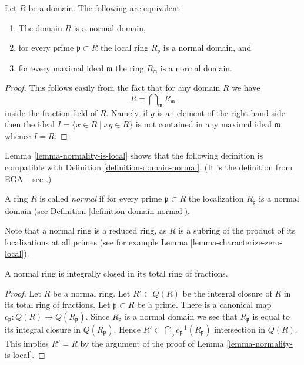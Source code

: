\begin{lemma}
\label{lemma-normality-is-local}
Let $R$ be a domain. The following are equivalent:
\begin{enumerate}
\item The domain $R$ is a normal domain,
\item for every prime $\mathfrak p \subset R$ the local ring
$R_{\mathfrak p}$ is a normal domain, and
\item for every maximal ideal $\mathfrak m$ the ring $R_{\mathfrak m}$
is a normal domain.
\end{enumerate}
\end{lemma}

\begin{proof}
This follows easily from the fact that for any domain $R$ we have
$$
R = \bigcap\nolimits_{\mathfrak m} R_{\mathfrak m}
$$
inside the fraction field of $R$. Namely, if $g$ is an element of
the right hand side then the ideal $I = \{x \in R \mid xg \in R\}$
is not contained in any maximal ideal $\mathfrak m$, whence $I = R$.
\end{proof}

\noindent
Lemma \ref{lemma-normality-is-local} shows that the following definition
is compatible with Definition \ref{definition-domain-normal}. (It is the
definition from EGA -- see \cite[IV, 5.13.5 and 0, 4.1.4]{EGA}.)

\begin{definition}
\label{definition-ring-normal}
A ring $R$ is called {\it normal} if for every prime
$\mathfrak p \subset R$ the localization $R_{\mathfrak p}$ is
a normal domain (see Definition \ref{definition-domain-normal}).
\end{definition}

\noindent
Note that a normal ring is a reduced ring, as $R$ is a subring of the product
of its localizations at all primes (see for example
Lemma \ref{lemma-characterize-zero-local}).

\begin{lemma}
\label{lemma-normal-ring-integrally-closed}
A normal ring is integrally closed in its total ring of fractions.
\end{lemma}

\begin{proof}
Let $R$ be a normal ring.
Let $R' \subset Q(R)$ be the integral closure of $R$ in its
total ring of fractions. Let $\mathfrak p \subset R$ be a prime.
There is a canonical map $c_{\mathfrak p} : Q(R) \to Q(R_{\mathfrak p})$.
Since $R_{\mathfrak p}$ is a normal domain we see that
$R_{\mathfrak p}$ is equal to its integral closure in $Q(R_{\mathfrak p})$.
Hence $R' \subset \bigcap_{\mathfrak p} c_{\mathfrak p}^{-1}(R_{\mathfrak p})$
intersection in $Q(R)$. This implies $R' = R$ by the argument of
the proof of Lemma \ref{lemma-normality-is-local}.
\end{proof}

